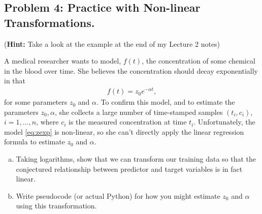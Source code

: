 \documentclass[10pt]{article}
\begin{document}
\subsection{Problem 4: Practice with Non-linear Transformations.}
(\textbf{Hint:} Take a look at the example at the end of my Lecture 2 notes)
\vspace{.5em}

 A medical researcher wants to model, $f(t)$, the concentration
of some chemical in the blood
over time. She believes the concentration should decay exponentially in that
\begin{align}
\label{eq:zexp}
f(t) = z_0 e^{-\alpha t},
\end{align}
for some parameters $z_0$ and $\alpha$.
To confirm this model, and to estimate the parameters $z_0,\alpha$,
she collects a large number of time-stamped samples $(t_i,c_i)$, $i=1,\ldots,n$, where $c_i$ is the measured concentration at time $t_i$.
Unfortunately, the model \eqref{eq:zexp} is non-linear, so she can't directly apply
the linear regression formula to estimate $z_0$ and $\alpha$.
\begin{enumerate}[(a)]
	\item  Taking logarithms, show that we can transform our training data so that the conjectured relationship between predictor and target variables is in fact linear. 
	\item Write pseudocode (or actual Python) for how you might estimate $z_0$ and $\alpha$ using this transformation. 
	

\end{enumerate}
\end{document}
